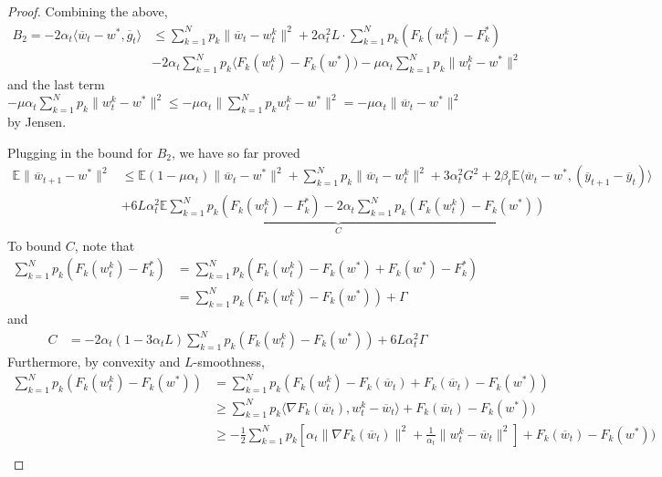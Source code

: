 \begin{proof}
	Combining the above, 
	\begin{align*}
	B_{2}=-2\alpha_{t}\langle\overline{w}_{t}-w^{\ast},\overline{g}_{t}\rangle & \leq\sum_{k=1}^{N}p_{k}\|\overline{w}_{t}-w_{t}^{k}\|^{2}+2\alpha_{t}^{2}L\cdot\sum_{k=1}^{N}p_{k}(F_{k}(w_{t}^{k})-F_{k}^{\ast})\\
	& -2\alpha_{t}\sum_{k=1}^{N}p_{k}\langle F_{k}(w_{t}^{k})-F_{k}(w^{\ast}))-\mu\alpha_{t}\sum_{k=1}^{N}p_{k}\|w_{t}^{k}-w^{\ast}\|^{2}
	\end{align*}
	and the last term $-\mu\alpha_{t}\sum_{k=1}^{N}p_{k}\|w_{t}^{k}-w^{\ast}\|^{2}\leq-\mu\alpha_{t}\|\sum_{k=1}^{N}p_{k}w_{t}^{k}-w^{\ast}\|^{2}=-\mu\alpha_{t}\|\overline{w}_{t}-w^{\ast}\|^{2}$
	by Jensen. 
	
	Plugging in the bound for $B_{2}$, we have so far proved 
	\begin{align*}
	\mathbb{E}\|\overline{w}_{t+1}-w^{\ast}\|^{2} & \leq\mathbb{E}(1-\mu\alpha_{t})\|\overline{w}_{t}-w^{\ast}\|^{2}+\sum_{k=1}^{N}p_{k}\|\overline{w}_{t}-w_{t}^{k}\|^{2}+3\alpha_{t}^{2}G^{2}+2\beta_{t}\mathbb{E}\langle\overline{w}_{t}-w^{\ast},(\overline{y}_{t+1}-\overline{y}_{t})\rangle\\
	& +\underset{C}{\underbrace{6L\alpha_{t}^{2}\mathbb{E}\sum_{k=1}^{N}p_{k}(F_{k}(w_{t}^{k})-F_{k}^{\ast})-2\alpha_{t}\sum_{k=1}^{N}p_{k}(F_{k}(w_{t}^{k})-F_{k}(w^{\ast}))}}
	\end{align*}
	To bound $C$, note that 
	\begin{align*}
	\sum_{k=1}^{N}p_{k}(F_{k}(w_{t}^{k})-F_{k}^{\ast}) & =\sum_{k=1}^{N}p_{k}(F_{k}(w_{t}^{k})-F_{k}(w^{\ast})+F_{k}(w^{\ast})-F_{k}^{\ast})\\
	& =\sum_{k=1}^{N}p_{k}(F_{k}(w_{t}^{k})-F_{k}(w^{\ast}))+\Gamma
	\end{align*}
	and 
	\begin{align*}
	C & =-2\alpha_{t}(1-3\alpha_{t}L)\sum_{k=1}^{N}p_{k}(F_{k}(w_{t}^{k})-F_{k}(w^{\ast}))+6L\alpha_{t}^{2}\Gamma
	\end{align*}
	Furthermore, by convexity and $L$-smoothness,
	\begin{align*}
	\sum_{k=1}^{N}p_{k}(F_{k}(w_{t}^{k})-F_{k}(w^{\ast})) & =\sum_{k=1}^{N}p_{k}(F_{k}(w_{t}^{k})-F_{k}(\overline{w}_{t})+F_{k}(\overline{w}_{t})-F_{k}(w^{\ast}))\\
	& \geq\sum_{k=1}^{N}p_{k}\langle\nabla F_{k}(\overline{w}_{t}),w_{t}^{k}-\overline{w}_{t}\rangle+F_{k}(\overline{w}_{t})-F_{k}(w^{\ast}))\\
	& \geq-\frac{1}{2}\sum_{k=1}^{N}p_{k}\left[\alpha_{t}\|\nabla F_{k}(\overline{w}_{t})\|^{2}+\frac{1}{\alpha_{t}}\|w_{t}^{k}-\overline{w}_{t}\|^{2}\right]+F_{k}(\overline{w}_{t})-F_{k}(w^{\ast}))\\

\end{align*}
\end{proof}
